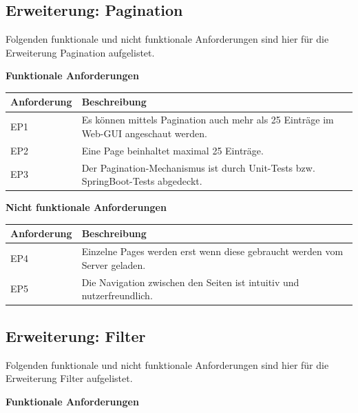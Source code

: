 \subsection{Erweiterung: Pagination}\label{ch:erweiterung-filter}
Folgenden funktionale und nicht funktionale Anforderungen sind hier für die Erweiterung Pagination aufgelistet.\newline

\noindent \textbf{Funktionale Anforderungen}\newline

\noindent \begin{tabular}{|p{3cm}|p{12cm}|}
	\hline
	\textbf{Anforderung}  & \textbf{Beschreibung} \\ \hline
	EP1    & Es können mittels Pagination auch mehr als 25 Einträge im Web-GUI angeschaut werden.     \\ \hline
	EP2    & Eine Page beinhaltet maximal 25 Einträge.     \\ \hline
	EP3    & Der Pagination-Mechanismus ist durch Unit-Tests bzw. SpringBoot-Tests abgedeckt.     \\ \hline
\end{tabular} \newline

\noindent \textbf{Nicht funktionale Anforderungen}\newline

\noindent \begin{tabular}{|p{3cm}|p{12cm}|}
	\hline
	\textbf{Anforderung}  & \textbf{Beschreibung} \\ \hline
	EP4    & Einzelne Pages werden erst wenn diese gebraucht werden vom Server geladen.     \\ \hline
	EP5    & Die Navigation zwischen den Seiten ist intuitiv und nutzerfreundlich.     \\ \hline
\end{tabular}

\subsection{Erweiterung: Filter}
Folgenden funktionale und nicht funktionale Anforderungen sind hier für die Erweiterung Filter aufgelistet.\newline

\noindent \textbf{Funktionale Anforderungen}\newline

